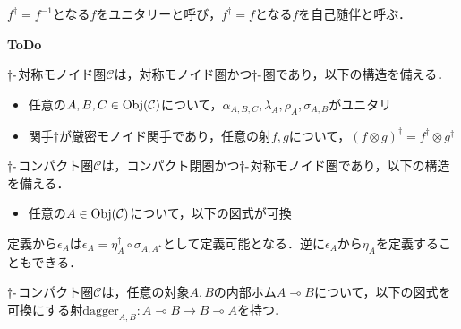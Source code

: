 \documentclass[type_judgement.tex]{subfiles}
\begin{document}
$f^\dagger=f^{-1}$となる$f$をユニタリーと呼び，$f^\dagger=f$となる$f$を自己随伴と呼ぶ．

\begin{defn}
  {\bf ToDo}
\end{defn}

\begin{defn}
$\dagger\mathchar`-$対称モノイド圏$\mathcal{C}$は，対称モノイド圏かつ$\dagger\mathchar`-$圏であり，以下の構造を備える．
\begin{itemize}
    \item 任意の$A,B,C\in\mathop{\mathrm{Obj}}\nolimits(\mathcal{C})$について，$\alpha_{A,B,C},\lambda_{A},\rho_{A},\sigma_{A,B}$がユニタリ
    \item 関手$\dagger$が厳密モノイド関手であり，任意の射$f,g$について，$(f\otimes g)^\dagger = f^\dagger \otimes g^\dagger$
\end{itemize}
\end{defn}

\begin{defn}
$\dagger\mathchar`-$コンパクト圏$\mathcal{C}$は，コンパクト閉圏かつ$\dagger\mathchar`-$対称モノイド圏であり，以下の構造を備える．
\begin{itemize}
    \item 任意の$A\in\mathop{\mathrm{Obj}}\nolimits(\mathcal{C})$について，以下の図式が可換\\
    \begin{center}
    \end{center}
\end{itemize}
\end{defn}
定義から$\epsilon_A$は$\epsilon_A=\eta_A^\dagger\circ\sigma_{A,A^\star}$として定義可能となる．逆に$\epsilon_A$から$\eta_A$を定義することもできる．

$\dagger\mathchar`-$コンパクト圏$\mathcal{C}$は，任意の対象$A,B$の内部ホム$A \multimap B$について，以下の図式を可換にする射$\mathrm{dagger}_{A,B}:A \multimap B \rightarrow B \multimap A$を持つ．
\begin{center}
\end{center}
\end{document}
